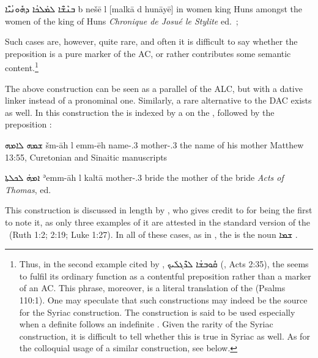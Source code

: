 {{{{
{ܒܢܶܫ̈ܶܐ ܠܡܰܠܟܳܐ ܕܗܽܘܢܳܝ̈ܶܐ}
{b\cb{} nešē l\cb{} [malkā d\cb{} hunāyē]}
{in\cb{} women \dat\cb{} king \lnk\cb{} Huns}
{amongst the women of the king of Huns}
{\textit{Chronique de Josué le Stylite} ed.\ \cite[18, 1]{Martin}; \cite[342, \S 362]{DuvalSyriaque}}


Such cases are, however, quite rare, and often it is difficult to say whether the preposition is a pure marker of the AC, or rather contributes some semantic content.\footnote{Thus, in the second example cited by \citet[342, \S 362]{DuvalSyriaque}, \textsyriac{ܩܽܘܒܫܳܐ ܠܖ̈ܶܓܠܰܝܟ}  (\Pesh, Acts 2:35), the  seems to fulfil its ordinary function as a contentful preposition rather than a marker of an AC. This phrase, moreover, is a literal translation of the \BHeb {} (Psalms 110:1). One may  speculate that such \BHeb constructions may indeed be the source for the Syriac construction. The \BHeb construction is said to be used especially when a definite \secn follows an indefinite \prim \parencites[157]{WaltkeOconnor}[63]{JenniLehrbuch}. Given the rarity of the Syriac construction, it is difficult to tell whether this is true in Syriac as well. As for the colloquial  usage of a similar construction, see below.}



The above construction can be seen as a parallel of the ALC, but with a dative linker instead of a pronominal one. Similarly, a rare alternative to the DAC exists as well. In this construction the \secn is indexed by a  on the \prim, followed by the preposition :

{ܫܡܗ ܠܐܡܗ}
{šm-āh l\cb{} emm-ēh}
{name-\poss.3\fem{} \dat\cb{} mother-\poss.3\masc}
{the name of his mother}
{Matthew 13:55, Curetonian \citep[ed.][]{Burkitt} and Sinaitic \citep[ed.][]{Lewis} manuscripts \apud \cite[56]{JoostenMatthew}}

{ܐܡܗ̇ ܠܟܠܬܐ}
{ʾemm-āh l\cb{} kaltā}
{mother-\poss.3\fem{} \dat\cb{} bride}
{the mother of the bride}
{\textit{Acts of Thomas}, ed.\ \cite[]{WrightActs}}


This construction is discussed in length 
by \citet{HopkinsName}, who gives credit to \citet[324]{GoldenbergUllendorff} for being the first to note it, as only three examples of it are attested in the standard version of the \Pesh\  (Ruth 1:2; 2:19; Luke 1:27). In all of these cases, as in , the \prim is the noun \textsyriac{ܫܡܐ}  .



}}}}
